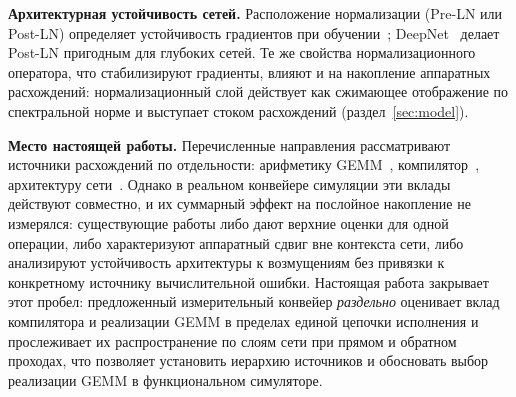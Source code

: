 \textbf{Архитектурная устойчивость сетей.}
Расположение нормализации (Pre-LN или Post-LN) определяет устойчивость градиентов
при обучении~\cite{Xiong2020}; DeepNet~\cite{Wang2022} делает Post-LN пригодным
для глубоких сетей. Те же свойства нормализационного оператора, что стабилизируют
градиенты, влияют и на накопление аппаратных расхождений: нормализационный слой
действует как сжимающее отображение по спектральной норме и выступает стоком
расхождений (раздел~\ref{sec:model}).

\textbf{Место настоящей работы.}
Перечисленные направления рассматривают источники расхождений по отдельности:
арифметику GEMM~\cite{Higham2002,MMASim2025,Khattak2025}, компилятор~\cite{Snider2023},
архитектуру сети~\cite{Xiong2020}. Однако в реальном конвейере симуляции эти
вклады действуют совместно, и их суммарный эффект на послойное накопление
не измерялся: существующие работы либо дают верхние оценки для одной операции,
либо характеризуют аппаратный сдвиг вне контекста сети, либо анализируют
устойчивость архитектуры к возмущениям без привязки к конкретному источнику
вычислительной ошибки. Настоящая работа закрывает этот пробел: предложенный
измерительный конвейер \emph{раздельно} оценивает вклад компилятора и реализации
GEMM в пределах единой цепочки исполнения и прослеживает их распространение по
слоям сети при прямом и обратном проходах, что позволяет установить иерархию
источников и обосновать выбор реализации GEMM в функциональном симуляторе.
